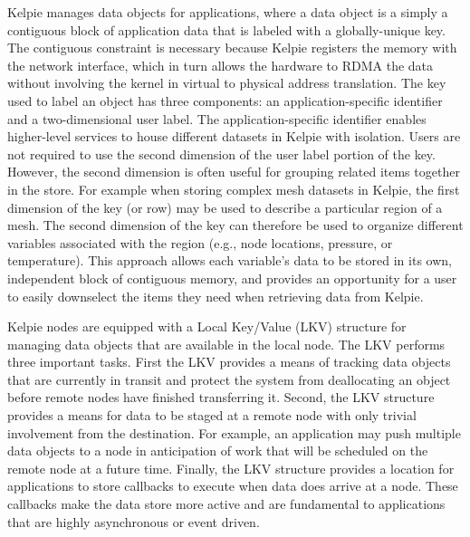 Kelpie manages data objects for applications, where a data object is a simply a
contiguous block of application data that is labeled with a globally-unique
key. The contiguous constraint is necessary because Kelpie registers the memory
with the network interface, which in turn allows the hardware to RDMA the data
without involving the kernel in virtual to physical address translation. The
key used to label an object has three components: an application-specific
identifier and a two-dimensional user label. The application-specific
identifier enables higher-level services to house different datasets in Kelpie
with isolation. Users are not required to use the second dimension of the user
label portion of the key. However, the second dimension is often useful for
grouping related items together in the store. For example when storing complex
mesh datasets in Kelpie, the first dimension of the key (or row) may be used to
describe a particular region of a mesh. The second dimension of the key can
therefore be used to organize different variables associated with the region
(e.g., node locations, pressure, or temperature). This approach allows each
variable's data to be stored in its own, independent block of contiguous
memory, and provides an opportunity for a user to easily downselect the items
they need when retrieving data from Kelpie.

Kelpie nodes are equipped with a Local Key/Value (LKV) structure for managing
data objects that are available in the local node. The LKV performs three
important tasks. First the LKV provides a means of tracking data objects that
are currently in transit and protect the system from deallocating an object
before remote nodes have finished transferring it. Second, the LKV structure
provides a means for data to be staged at a remote node with only trivial
involvement from the destination. For example, an application may push multiple
data objects to a node in anticipation of work that will be scheduled on the
remote node at a future time. Finally, the LKV structure provides a location
for applications to store callbacks to execute when data does arrive at a node.
These callbacks make the data store more active and are fundamental to
applications that are highly asynchronous or event driven.

